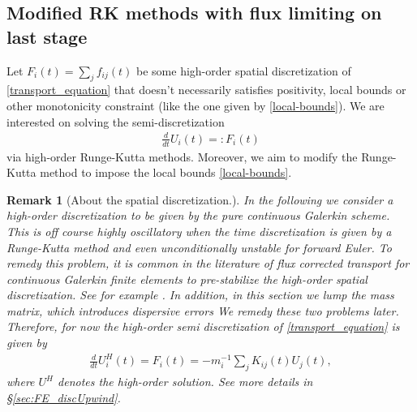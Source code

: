 \documentclass{article}
\newtheorem{remark}{Remark}
\numberwithin{remark}{subsection}
\begin{document}
\subsection{Modified RK methods with flux limiting on last stage}
Let $F_i(t)=\sum_j f_{ij}(t)$ be some high-order spatial discretization of
\eqref{transport_equation}
that doesn't necessarily satisfies positivity, local bounds or other monotonicity constraint
(like the one given by \eqref{local-bounds}).
%
We are interested on solving the semi-discretization
\begin{align}
  \frac{d}{dt} U_i(t)=:F_i(t) %
\end{align}
via high-order Runge-Kutta methods. Moreover, we aim to modify the Runge-Kutta method
to impose the local bounds \eqref{local-bounds}.

\begin{remark}[About the spatial discretization.]
  In the following we consider a high-order discretization to be given by the pure
  continuous Galerkin scheme. This is off course highly oscillatory when the time discretization
  is given by a Runge-Kutta method and even unconditionally unstable for forward Euler.
  To remedy this problem, it is common in the literature of flux corrected transport
  for continuous Galerkin finite elements to pre-stabilize the high-order spatial discretization.
  See for example \cite{lohmann2017flux,guermond2014second}.
  In addition, in this section we lump the mass matrix, 
  which introduces dispersive errors \cite{guermond2017effect}
  We remedy these two problems later.
  Therefore, for now the high-order semi discretization of \eqref{transport_equation} is given by
  \begin{align}\label{high-order_semi-discretization}
    \frac{d}{dt}U_i^H(t)=F_i(t)=-m_i^{-1}\sum_j K_{ij}(t) U_j(t),
  \end{align}
  where $U^H$ denotes the high-order solution. See more details in \S\ref{sec:FE_discUpwind}.
\end{remark}
\end{document}

